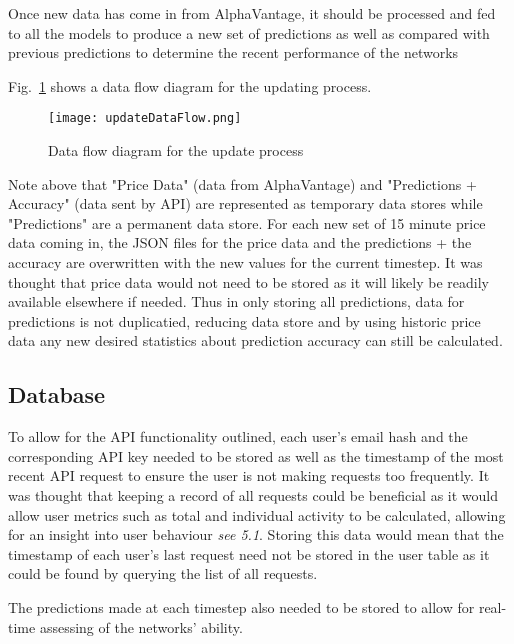             Once new data has come in from AlphaVantage, it should be processed and fed to all the models to produce a new set of predictions as well as compared with previous predictions to determine the recent performance of the networks

            Fig.~\ref{fig:updateDataFlow} shows a data flow diagram for the updating process.

            \begin{figure}[htbp]
                \centering
                \texttt{[image: updateDataFlow.png]}
                \caption{Data flow diagram for the update process}
                \label{fig:updateDataFlow}
            \end{figure}
            

        Note above that "Price Data" (data from AlphaVantage) and "Predictions + Accuracy" (data sent by API) are represented as temporary data stores while "Predictions" are a permanent data store. For each new set of 15 minute price data coming in, the JSON files for the price data and the predictions + the accuracy are overwritten with the new values for the current timestep. It was thought that price data would not need to be stored as it will likely be readily available elsewhere if needed. Thus in only storing all predictions, data for predictions is not duplicatied, reducing data store and by using historic price data any new desired statistics about prediction accuracy can still be calculated.
        
        \subsection{Database}
        To allow for the API functionality outlined, each user's email hash and the corresponding API key needed to be stored as well as the timestamp of the most recent API request to ensure the user is not making requests too frequently. It was thought that keeping a record of all requests could be beneficial as it would allow user metrics such as total and individual activity to be calculated, allowing for an insight into user behaviour \textit{see 5.1}. Storing this data would mean that the timestamp of each user's last request need not be stored in the user table as it could be found by querying the list of all requests.

        The predictions made at each timestep also needed to be stored to allow for real-time assessing of the networks' ability.
        
